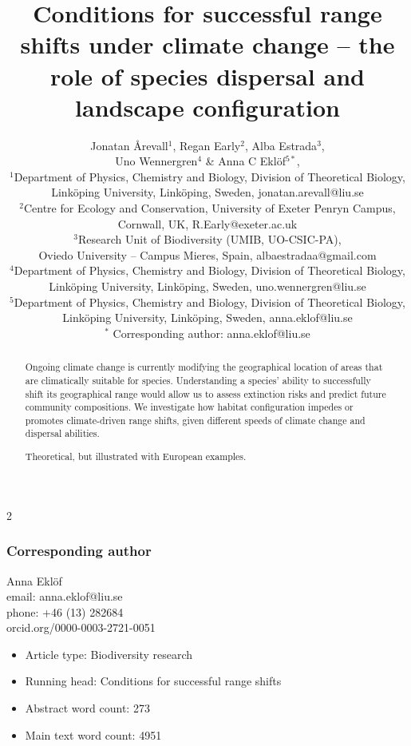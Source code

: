 \documentclass[12pt,pdftex]{article}
\date{}
\title{Conditions for successful range shifts under climate change -- the role of species dispersal and landscape configuration}
\author{Jonatan \r{A}revall$^{1}$,  Regan Early$^{2}$, Alba Estrada$^{3}$, \\ Uno Wennergren$^{4}$ \& Anna C Ekl\"{o}f$^{5*}$,\\
 $^1$\small Department of Physics, Chemistry and Biology, Division of Theoretical Biology,\\ \small  Link\"{o}ping University, Link\"{o}ping, Sweden, jonatan.arevall@liu.se\\
 $^2$\small Centre for Ecology and Conservation, University of Exeter Penryn Campus,\\ \small Cornwall, UK, R.Early@exeter.ac.uk\\
 $^3$\small Research Unit of Biodiversity (UMIB, UO-CSIC-PA), \\ \small Oviedo University – Campus Mieres, Spain, albaestradaa@gmail.com \\
 $^4$\small Department of Physics, Chemistry and Biology, Division of Theoretical Biology,\\ \small  Link\"{o}ping University, Link\"{o}ping, Sweden, uno.wennergren@liu.se\\
 $^5$\small Department of Physics, Chemistry and Biology, Division of Theoretical Biology,\\ \small  Link\"{o}ping University, Link\"{o}ping, Sweden, anna.eklof@liu.se\\
  $^*$ \small Corresponding author: anna.eklof@liu.se\\
}
\begin{document}
\linenumbers
\maketitle
\baselineskip 18pt
\begin{spacing}{2}

\subsubsection*{Corresponding author}
Anna Ekl\"{o}f\\
email: anna.eklof@liu.se\\
phone: +46 (13) 282684\\
orcid.org/0000-0003-2721-0051\\


%

\clearpage

\begin{itemize}
\item Article type: Biodiversity research
\item Running head: Conditions for successful range shifts
\item Abstract word count: 273
\item Main text word count: 4951 %
\end{itemize}

\clearpage


\begin{abstract}
 Ongoing climate change is currently modifying the geographical location of areas that are climatically suitable for species. Understanding a species' ability to successfully shift its geographical range would allow us to assess extinction risks and predict future community compositions. We investigate how habitat configuration impedes or promotes climate-driven range shifts, given different speeds of climate change and dispersal abilities.

Theoretical, but illustrated with European examples.


\end{abstract}
\end{spacing}
\end{document}
